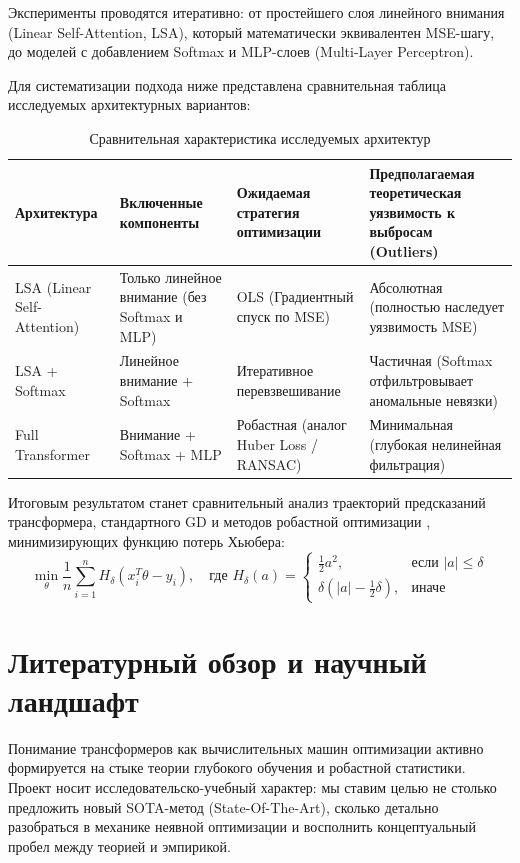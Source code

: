 \documentclass[12pt,a4paper]{article}
\begin{document}
Эксперименты проводятся итеративно: от простейшего слоя линейного внимания (Linear Self-Attention, LSA), который математически эквивалентен MSE-шагу, до моделей с добавлением Softmax и MLP-слоев (Multi-Layer Perceptron).

Для систематизации подхода ниже представлена сравнительная таблица исследуемых архитектурных вариантов:

\begin{table}[htbp]
\centering
\caption{Сравнительная характеристика исследуемых архитектур}
\vspace{0.5em}
\begin{tabular}{|p{4.5cm}|p{3.5cm}|p{3.5cm}|p{4cm}|}
\hline
\textbf{Архитектура} & \textbf{Включенные компоненты} & \textbf{Ожидаемая стратегия оптимизации} & \textbf{Предполагаемая теоретическая уязвимость к выбросам (Outliers)} \\ \hline
LSA (Linear Self-Attention) & Только линейное внимание (без Softmax и MLP) & OLS (Градиентный спуск по MSE) & Абсолютная (полностью наследует уязвимость MSE) \\ \hline
LSA + Softmax & Линейное внимание + Softmax & Итеративное перевзвешивание & Частичная (Softmax отфильтровывает аномальные невязки) \\ \hline
Full Transformer & Внимание + Softmax + MLP & Робастная (аналог Huber Loss / RANSAC) & Минимальная (глубокая нелинейная фильтрация) \\ \hline
\end{tabular}
\end{table}

Итоговым результатом станет сравнительный анализ траекторий предсказаний трансформера, стандартного GD и методов робастной оптимизации \cite{huber1964robust}, минимизирующих функцию потерь Хьюбера:
\begin{equation}
    \min_\theta \frac{1}{n} \sum_{i=1}^n H_\delta(x_i^T \theta - y_i), \quad \text{где } H_\delta(a) = \begin{cases}
      \frac{1}{2}a^2, & \text{если } |a| \leq \delta \\
      \delta(|a| - \frac{1}{2}\delta), & \text{иначе}
   \end{cases}
\end{equation}

\section{Литературный обзор и научный ландшафт}
Понимание трансформеров как вычислительных машин оптимизации активно формируется на стыке теории глубокого обучения и робастной статистики. Проект носит исследовательско-учебный характер: мы ставим целью не столько предложить новый SOTA-метод (State-Of-The-Art), сколько детально разобраться в механике неявной оптимизации и восполнить концептуальный пробел между теорией и эмпирикой.
\end{document}
